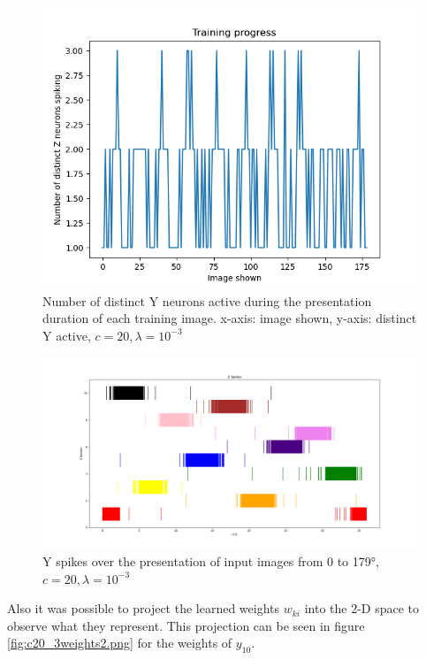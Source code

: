 \begin{figure}
  \includegraphics[width=\linewidth]{figures/angleNetwork/c20_3validationDistinctZSpikes.png}
  \caption{Number of distinct Y neurons active during the presentation duration of each training image. x-axis: image shown, y-axis: distinct Y active, $c = 20, \lambda = 10^{-3}$}
  \label{fig:c20_3validationDistinctZSpikes}
\end{figure}

\begin{figure}
  \includegraphics[width=\linewidth]{figures/angleNetwork/c20_3validationZSpikes.png}
  \caption{Y spikes over the presentation of input images from 0 to 179°, $c = 20, \lambda = 10^{-3}$}
  \label{fig:c20_3validationZSpikes}
\end{figure}

Also it was possible to project the learned weights $w_{ki}$ into the 2-D space to observe what they represent. This projection can be seen in figure \ref{fig:c20_3weights2.png} for the weights of $y_10$.

